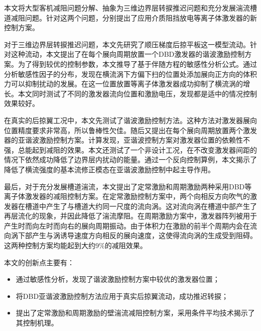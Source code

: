 \begin{cabstract}
  本文将大型客机减阻问题分解、抽象为三维边界层转捩推迟问题和充分发展湍流槽道减阻问题。针对这两个问题，分别提出了应用介质阻挡放电等离子体激发器的新控制方案。

  对于三维边界层转捩推迟问题，本文先研究了顺压梯度后掠平板这一模型流动。针对这种流动，本文提出了在每个展向周期放置一个DBD激发器的谐波激励控制方案。为了得到较优的控制参数，本文推导了基于伴随方程的敏感性分析公式。通过分析敏感性因子的分布，发现在横流涡下方偏下扫的位置处添加展向正方向的体积力可以抑制扰动的发展。在这一位置放置等离子体激发器成功抑制了横流涡的增长。本文同时测试了不同的激发器流向位置和激励电压，发现都是适中的情况控制效果较好。

  在真实的后掠翼工况中，本文先测试了谐波激励控制方法。这种方法对激发器展向位置精度要求非常高，所以鲁棒性欠佳。随后又提出在每个展向周期放置两个激发器的亚谐波激励控制方案。计算发现，亚谐波控制方案对激发器位置的依赖性不强，总能起到减阻的效果。本文还测试了一个非设计工况，在不改变激发器间距的情况下依然成功降低了边界层内扰动的能量。通过一个反向控制算例，本文揭示了降低了横流强度的基本流修正模态在亚谐波激励控制中起主导作用。

  最后，对于充分发展槽道湍流，本文提出了定常激励和周期激励两种采用DBD等离子体激发器的减阻控制方案。在定常激励控制方案中，两个向相反方向吹气的激发器在槽道中产生了与槽道大约同一尺度的流向涡。这对流向涡在槽道中部产生了再层流化的现象，并因此降低了湍流摩阻。在周期激励方案中，激发器阵列被用于产生时而向左时而向右的展向周期振动。由于体积力在激励的前半个周期内会在流向涡下部产生与涡诱导速度方向相反的展向速度，这使得流向涡的生成受到阻碍。这两种控制方案均能起到大约9\%的减阻效果。

  本文的创新点主要有：
  \begin{itemize}
    \item 通过敏感性分析，发现了谐波激励控制方案中较优的激发器位置；
    \item 将DBD亚谐波激励控制方法应用于真实后掠翼流动，成功推迟转捩；
    \item 提出了定常激励和周期激励的壁湍流减阻控制方案，采用条件平均技术揭示了其控制机理。
  \end{itemize}
\end{cabstract}


